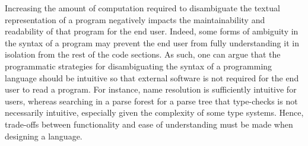 
Increasing the amount of computation required to disambiguate the textual representation of a program negatively impacts the maintainability and readability of that program for the end user.
Indeed, some forms of ambiguity in the syntax of a program may prevent the end user from fully understanding it in isolation from the rest of the code sections.
As such, one can argue that the programmatic strategies for disambiguating the syntax of a programming language should be intuitive so that external software is not required for the end user to read a program.
For instance, name resolution is sufficiently intuitive for users, whereas searching in a parse forest for a parse tree that type-checks is not necessarily intuitive, especially given the complexity of some type systems.
Hence, trade-offs between functionality and ease of understanding must be made when designing a language.



